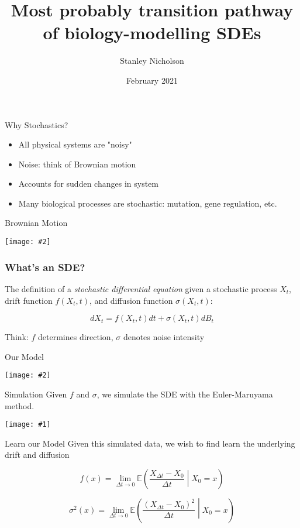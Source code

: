 \documentclass{beamer}
\title{Most probably transition pathway of biology-modelling SDEs}
\author{Stanley Nicholson}
\institute{Illinois Institute of Technology}
\date{February 2021}
\newcommand {\framedgraphic}[2] {
    \begin{frame}{#1}
        \begin{center}
            \texttt{[image: \#2]}
        \end{center}
    \end{frame}
}
\newcommand{\graphic}[1] {
    \begin{center}
        \texttt{[image: \#1]}
    \end{center}
}
\begin{document}
\frame{\titlepage}

\begin{frame}{Why Stochastics?}
    \begin{itemize}
        \item<1-> All physical systems are "noisy"
        \item<2-> Noise: think of Brownian motion
        \item<3-> Accounts for sudden changes in system
        \item<4-> Many biological processes are stochastic: mutation, gene regulation, etc.
    \end{itemize}
\end{frame}

\framedgraphic{Brownian Motion}{brownian.pdf}

\begin{frame}
\frametitle{What's an SDE?}
The definition of a \textit{stochastic differential equation} given a stochastic process $X_t$, drift function $f(X_t, t)$, and diffusion function $\sigma(X_t, t)$:

\begin{equation}\label{eq:SDE}
    dX_t = f(X_t, t)dt + \sigma(X_t, t)dB_t
\end{equation}

Think: $f$ determines direction, $\sigma$ denotes noise intensity

\end{frame}

\framedgraphic{Our Model}{actualfunc.pdf}

\begin{frame}{Simulation}
    Given $f$ and $\sigma$, we simulate the SDE with the Euler-Maruyama method.
    \graphic{simulated_labeled.pdf}
\end{frame}

\begin{frame}{Learn our Model}
    Given this simulated data, we wish to find learn the underlying drift and diffusion\pause

    \begin{equation}\label{eq:drift}
        f(x) = \lim_{\Delta t \to 0} \mathbb{E}\left(\frac{X_{\Delta t}-X_0}{\Delta t} \middle| X_0 = x\right)
    \end{equation}

    \begin{equation}\label{eq:diffusion}
        \sigma^2(x) = \lim_{\Delta t \to 0} \mathbb{E}\left(\frac{(X_{\Delta t}-X_0)^2}{\Delta t} \middle| X_0 = x\right)
    \end{equation}
\end{frame}
\end{document}
